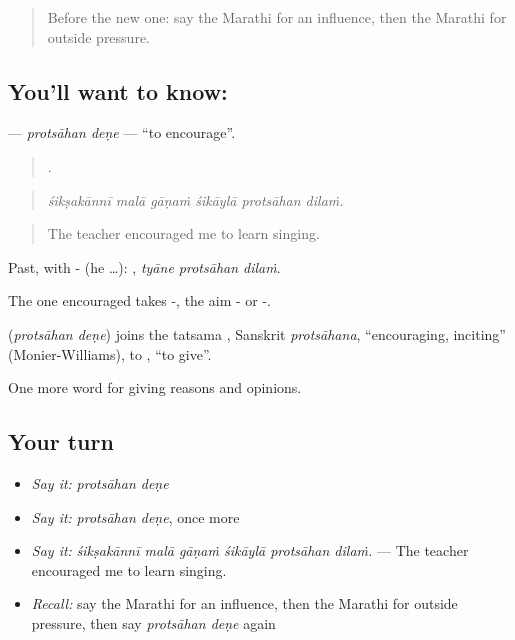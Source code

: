 \label{lesson:MR-C377-protsahan-dene}



\begin{quote}
Before the new one: say the Marathi for an influence, then the Marathi for outside pressure.
\end{quote}

\subsection*{You'll want to know:  }
\textbf{ } — \emph{protsāhan deṇe} — \textquotedblleft{}to encourage\textquotedblright{}.

\begin{quote}
     .
\end{quote}

\begin{quote}
\emph{śikṣakānnī malā gāṇaṁ śikāylā protsāhan dilaṁ.}
\end{quote}

\begin{quote}
The teacher encouraged me to learn singing.
\end{quote}

Past, with - (he …):   , \emph{tyāne protsāhan dilaṁ}.

The one encouraged takes -, the aim - or -.

\begin{cousinweb}
\textbf{ } (\emph{protsāhan deṇe}) joins the tatsama , Sanskrit \emph{protsāhana}, \textquotedblleft{}encouraging, inciting\textquotedblright{} (Monier-Williams), to , \textquotedblleft{}to give\textquotedblright{}.
\end{cousinweb}

\begin{grammarlens}[title={What you've built}]
One more word for giving reasons and opinions.
\end{grammarlens}

\subsection*{Your turn}
\begin{itemize}
\raggedright
  \item \emph{Say it:} \emph{protsāhan deṇe}
  \item \emph{Say it:} \emph{protsāhan deṇe}, once more
  \item \emph{Say it:} \emph{śikṣakānnī malā gāṇaṁ śikāylā protsāhan dilaṁ.} — The teacher encouraged me to learn singing.
  \item \emph{Recall:} say the Marathi for an influence, then the Marathi for outside pressure, then say \emph{protsāhan deṇe} again
\end{itemize}

